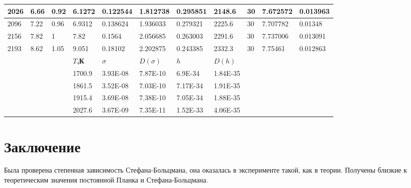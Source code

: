 \documentclass[%
 reprint,
 amsmath,amssymb,
 aps,
]{revtex4-2}
\begin{document}
\begin{table}[]
\begin{tabular}{lll|l|l|l|l|l|lll}
		\multicolumn{1}{|l|}{2026}       & \multicolumn{1}{l|}{6.66}  & 0.92  & 6.1272         & 0.122544          & 1.812738             & 0.295851     & 2148.6          & \multicolumn{1}{l|}{30}        & \multicolumn{1}{l|}{7.672572} & \multicolumn{1}{l|}{0.013963}   \\ \hline
		\multicolumn{1}{|l|}{2096}       & \multicolumn{1}{l|}{7.22}  & 0.96  & 6.9312         & 0.138624          & 1.936033             & 0.279321     & 2225.6          & \multicolumn{1}{l|}{30}        & \multicolumn{1}{l|}{7.707782} & \multicolumn{1}{l|}{0.01348}    \\ \hline
		\multicolumn{1}{|l|}{2156}       & \multicolumn{1}{l|}{7.82}  & 1     & 7.82           & 0.1564            & 2.056685             & 0.263003     & 2291.6          & \multicolumn{1}{l|}{30}        & \multicolumn{1}{l|}{7.737006} & \multicolumn{1}{l|}{0.013091}   \\ \hline
		\multicolumn{1}{|l|}{2193}       & \multicolumn{1}{l|}{8.62}  & 1.05  & 9.051          & 0.18102           & 2.202875             & 0.243385     & 2332.3          & \multicolumn{1}{l|}{30}        & \multicolumn{1}{l|}{7.75461}  & \multicolumn{1}{l|}{0.012863}   \\ \hline
		&                            &       & \textbf{$T$,К} & \textbf{$\sigma$} & \textbf{$D(\sigma)$} & \textbf{$h$} & \textbf{$D(h)$} &                                &                               &                                 \\ \cline{4-8}
		&                            &       & 1700.9         & 3.93E-08          & 7.87E-10             & 6.9E-34      & 1.84E-35        &                                &                               &                                 \\ \cline{4-8}
		&                            &       & 1861.5         & 3.52E-08          & 7.03E-10             & 7.17E-34     & 1.91E-35        &                                &                               &                                 \\ \cline{4-8}
		&                            &       & 1915.4         & 3.69E-08          & 7.38E-10             & 7.05E-34     & 1.88E-35        &                                &                               &                                 \\ \cline{4-8}
		&                            &       & 2027.6         & 3.67E-09          & 7.35E-11             & 1.52E-33     & 4.06E-35        &                                &                               &                                 \\ \cline{4-8}
	\end{tabular}
\end{table}


\section{Заключение}

Была проверена степенная зависимость Стефана-Больцмана, она оказалась в эксперименте такой, как в теории. Получены близкие к теоретическим значения постоянной Планка и Стефана-Больцмана.
\end{document}
